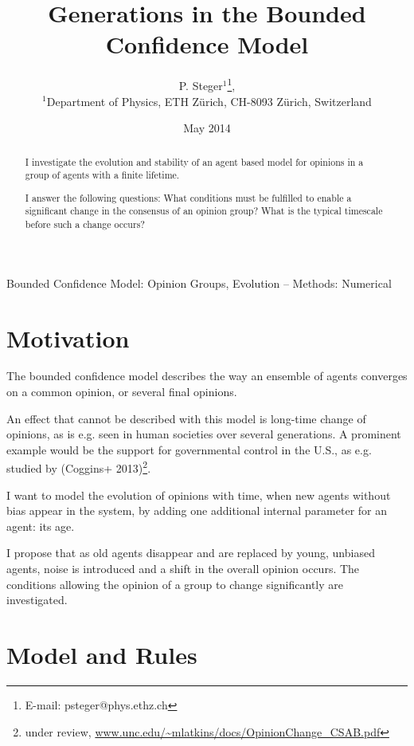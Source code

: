 \documentclass[useAMS,usenatbib]{templates/mn2e}
\title[Generations in Bounded Confidence]{Generations in the Bounded Confidence Model}
\author[P. Steger]{P. Steger$^{1}$\thanks{E-mail: psteger@phys.ethz.ch},\\
 $^{1}$Department of Physics, ETH Z\"urich, CH-8093 Z\"urich,
 Switzerland
}
\begin{document}
\date{May 2014}
\label{firstpage}
\maketitle

\begin{abstract}
    I investigate the evolution and stability of an
    agent based model for opinions in a group of agents with a
    finite lifetime.

    I answer the following questions: What conditions must be fulfilled to
    enable a significant change in the consensus of an opinion group?
    What is the typical timescale before such a change occurs?
\end{abstract}

\begin{keywords}
 Bounded Confidence Model: Opinion Groups, Evolution --
 Methods: Numerical
\end{keywords}



\section{Motivation}
\label{sec:motivation}
The bounded confidence model describes the way an ensemble of agents
converges on a common opinion, or several final opinions.

An effect that cannot be described with this model is long-time change
of opinions, as is e.g. seen in human societies over several
generations. A prominent example would be the support for governmental control
in the U.S., as e.g. studied by (Coggins+ 2013)\footnote{under review,
\url{www.unc.edu/~mlatkins/docs/OpinionChange_CSAB.pdf}}.

I want to model the evolution of opinions with time, when new agents
without bias appear in the system, by adding one additional internal
parameter for an agent: its age.

I propose that as old agents disappear and are replaced by young,
unbiased agents, noise is introduced and a shift in the overall
opinion occurs. The conditions allowing the opinion of a group to
change significantly are investigated.


\section{Model and Rules}
\label{sec:model}
\end{document}
